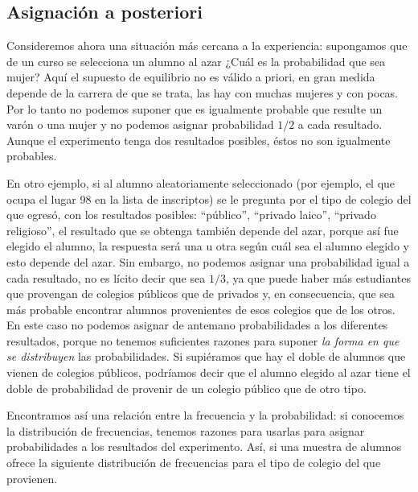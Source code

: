 \documentclass[]{book}
\begin{document}
\hypertarget{asignacion-a-posteriori}{%
\subsection{Asignación a posteriori}\label{asignacion-a-posteriori}}

Consideremos ahora una situación más cercana a la experiencia:
supongamos que de un curso se selecciona un alumno al azar ¿Cuál es la
probabilidad que sea mujer? Aquí el supuesto de equilibrio no es válido
a priori, en gran medida depende de la carrera de que se trata, las hay
con muchas mujeres y con pocas. Por lo tanto no podemos suponer que es
igualmente probable que resulte un varón o una mujer y no podemos
asignar probabilidad \(1/2\) a cada resultado. Aunque el experimento tenga dos
resultados posibles, éstos no son igualmente probables.

En otro ejemplo, si al alumno aleatoriamente seleccionado (por ejemplo, el que ocupa el lugar 98 en la lista de inscriptos) se le pregunta
por el tipo de colegio del que egresó, con los resultados posibles:
``público'', ``privado laico'', ``privado religioso'', el resultado que se
obtenga también depende del azar, porque así fue elegido el alumno, la
respuesta será una u otra según cuál sea el alumno elegido y esto
depende del azar. Sin embargo, no podemos asignar una probabilidad igual
a cada resultado, no es lícito decir que sea \(1/3\), ya que puede haber más
estudiantes que provengan de colegios públicos que de privados y, en
consecuencia, que sea más probable encontrar alumnos provenientes de
esos colegios que de los otros. En este caso no podemos asignar de
antemano probabilidades a los diferentes resultados, porque no tenemos
suficientes razones para suponer \emph{la forma en que se distribuyen} las
probabilidades. Si supiéramos que hay el doble de alumnos que vienen de
colegios públicos, podríamos decir que el alumno elegido al azar tiene
el doble de probabilidad de provenir de un colegio público que de otro
tipo.

Encontramos así una relación entre la frecuencia y la probabilidad: si
conocemos la distribución de frecuencias, tenemos razones para usarlas
para asignar probabilidades a los resultados del experimento. Así, si
una muestra de alumnos ofrece la siguiente distribución de frecuencias
para el tipo de colegio del que provienen.
\end{document}
